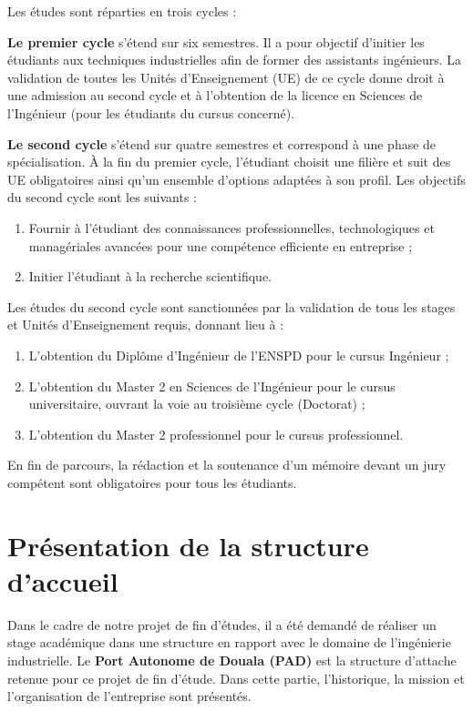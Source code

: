 \documentclass[a4paper,12pt,openany]{report}
\begin{document}
Les études sont réparties en trois cycles :

\textbf{Le premier cycle} s’étend sur six semestres. Il a pour objectif d’initier les étudiants aux techniques industrielles afin de former des assistants ingénieurs. La validation de toutes les Unités d’Enseignement (UE) de ce cycle donne droit à une admission au second cycle et à l’obtention de la licence en Sciences de l’Ingénieur (pour les étudiants du cursus concerné).

\textbf{Le second cycle} s’étend sur quatre semestres et correspond à une phase de spécialisation. À la fin du premier cycle, l’étudiant choisit une filière et suit des UE obligatoires ainsi qu’un ensemble d’options adaptées à son profil. Les objectifs du second cycle sont les suivants :
\begin{enumerate}
	\item Fournir à l’étudiant des connaissances professionnelles, technologiques et managériales avancées pour une compétence efficiente en entreprise ;
	\item Initier l’étudiant à la recherche scientifique.
\end{enumerate}

Les études du second cycle sont sanctionnées par la validation de tous les stages et Unités d’Enseignement requis, donnant lieu à :
\begin{enumerate}
	\item L’obtention du Diplôme d’Ingénieur de l’ENSPD pour le cursus Ingénieur ;
	\item L’obtention du Master 2 en Sciences de l’Ingénieur pour le cursus universitaire, ouvrant la voie au troisième cycle (Doctorat) ;
	\item L’obtention du Master 2 professionnel pour le cursus professionnel.
\end{enumerate}

En fin de parcours, la rédaction et la soutenance d’un mémoire devant un jury compétent sont obligatoires pour tous les étudiants.
{}
	\chapter*{Présentation de la structure d’accueil}

Dans le cadre de notre projet de fin d’études, il a été demandé de réaliser un stage académique dans une structure en rapport avec le domaine de l’ingénierie industrielle. Le \textbf{Port Autonome de Douala (PAD)} est la structure d’attache retenue pour ce projet de fin d’étude. Dans cette partie, l’historique, la mission et l’organisation de l’entreprise sont présentés.
\end{document}
